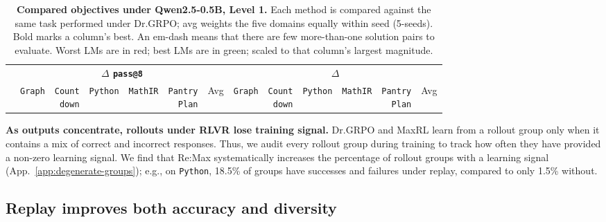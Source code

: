 \begin{table}[t]
  \centering
  \caption{\textbf{Compared objectives under Qwen2.5-0.5B, \mb{} Level 1.} Each method is compared against the same task performed under Dr.GRPO; avg weights the five domains equally within seed (5-seeds). Bold marks a column's best. An em-dash means that there are few more-than-one solution pairs to evaluate. Worst LMs are in red; best LMs are in green; scaled to that column's largest magnitude.}
  \label{tab:direct-comparator-matrix}
  \scriptsize
  \setlength{\tabcolsep}{1.4pt}
  \renewcommand{\arraystretch}{0.95}
  \begin{tabular}{@{}l*{12}{r}@{}}
    \toprule
    & \multicolumn{6}{c}{\textbf{$\Delta$ \texttt{pass@8}}}
      & \multicolumn{6}{c}{\textbf{$\Delta$ \pmd{}}} \\
    \cmidrule(lr){2-7}\cmidrule(l){8-13}
    & \texttt{Graph}
    & \shortstack{\texttt{Count}\\\texttt{down}}
    & \texttt{Python}
    & \texttt{MathIR}
    & \shortstack{\texttt{Pantry}\\\texttt{Plan}}
    & Avg
    & \texttt{Graph}
    & \shortstack{\texttt{Count}\\\texttt{down}}
    & \texttt{Python}
    & \texttt{MathIR}
    & \shortstack{\texttt{Pantry}\\\texttt{Plan}}
    & Avg \\
    \midrule
    
  \end{tabular}
\end{table}

\textbf{As outputs concentrate, rollouts under RLVR lose training signal.}
Dr.GRPO and MaxRL learn from a rollout group only when it contains a mix of correct and incorrect responses. Thus,
we audit every rollout group during training to track how often they have provided a non-zero learning signal. 
We find that Re:Max systematically increases the percentage of rollout groups with a learning signal (App.~\ref{app:degenerate-groups}); e.g., on \texttt{Python}, 18.5\% of groups have successes and failures under replay, compared to only 1.5\% without.

\subsection{Replay improves both accuracy and diversity}
\label{sec:results-retention}

